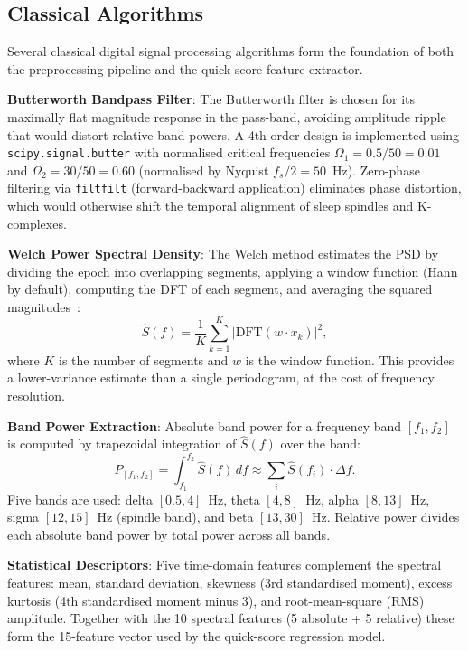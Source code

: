 \documentclass[10pt]{article}
\begin{document}
\subsection{Classical Algorithms}
\label{sec:classical}

Several classical digital signal processing algorithms form the foundation of both the preprocessing pipeline and the quick-score feature extractor.

\textbf{Butterworth Bandpass Filter}: The Butterworth filter is chosen for its maximally flat magnitude response in the pass-band, avoiding amplitude ripple that would distort relative band powers. A 4th-order design is implemented using \texttt{scipy.signal.butter} with normalised critical frequencies $\Omega_1 = 0.5/50 = 0.01$ and $\Omega_2 = 30/50 = 0.60$ (normalised by Nyquist $f_s/2 = 50$~Hz). Zero-phase filtering via \texttt{filtfilt} (forward-backward application) eliminates phase distortion, which would otherwise shift the temporal alignment of sleep spindles and K-complexes.

\textbf{Welch Power Spectral Density}: The Welch method estimates the PSD by dividing the epoch into overlapping segments, applying a window function (Hann by default), computing the DFT of each segment, and averaging the squared magnitudes~\cite{welch1967use}:
\begin{equation}
  \hat{S}(f) = \frac{1}{K} \sum_{k=1}^{K} \left| \text{DFT}(w \cdot x_k) \right|^2,
\end{equation}
where $K$ is the number of segments and $w$ is the window function. This provides a lower-variance estimate than a single periodogram, at the cost of frequency resolution.

\textbf{Band Power Extraction}: Absolute band power for a frequency band $[f_1, f_2]$ is computed by trapezoidal integration of $\hat{S}(f)$ over the band:
\begin{equation}
  P_{[f_1,f_2]} = \int_{f_1}^{f_2} \hat{S}(f)\, df \approx \sum_i \hat{S}(f_i) \cdot \Delta f.
\end{equation}
Five bands are used: delta $[0.5, 4]$~Hz, theta $[4, 8]$~Hz, alpha $[8, 13]$~Hz, sigma $[12, 15]$~Hz (spindle band), and beta $[13, 30]$~Hz. Relative power divides each absolute band power by total power across all bands.

\textbf{Statistical Descriptors}: Five time-domain features complement the spectral features: mean, standard deviation, skewness (3rd standardised moment), excess kurtosis (4th standardised moment minus 3), and root-mean-square (RMS) amplitude. Together with the 10 spectral features (5 absolute + 5 relative) these form the 15-feature vector used by the quick-score regression model.
\end{document}
